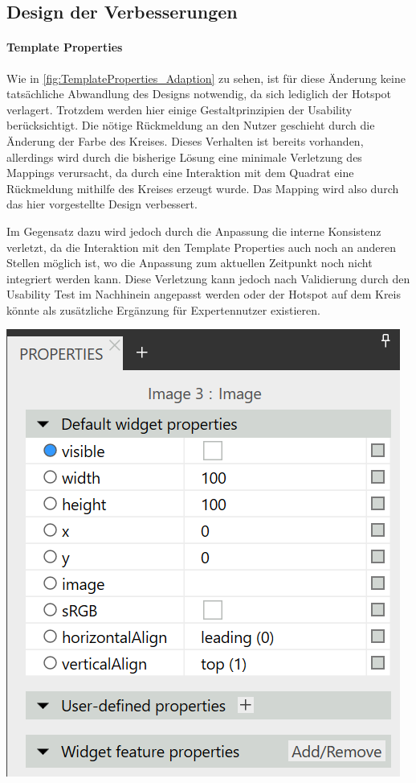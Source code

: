 \subsection{Design der Verbesserungen}

\paragraph{Template Properties}

Wie in \cref{fig:TemplateProperties_Adaption} zu sehen, ist für diese Änderung keine tatsächliche Abwandlung des Designs notwendig, da sich lediglich der Hotspot verlagert.
Trotzdem werden hier einige Gestaltprinzipien der Usability berücksichtigt.
Die nötige Rückmeldung an den Nutzer geschieht durch die Änderung der Farbe des Kreises.
Dieses Verhalten ist bereits vorhanden, allerdings wird durch die bisherige Lösung eine minimale Verletzung des Mappings verursacht, da durch eine Interaktion mit dem Quadrat eine Rückmeldung mithilfe des Kreises erzeugt wurde. 
Das Mapping wird also durch das hier vorgestellte Design verbessert.

Im Gegensatz dazu wird jedoch durch die Anpassung die interne Konsistenz verletzt, da die Interaktion mit den Template Properties auch noch an anderen Stellen möglich ist, wo die Anpassung zum aktuellen Zeitpunkt noch nicht integriert werden kann.
Diese Verletzung kann jedoch nach Validierung durch den Usability Test im Nachhinein angepasst werden oder der Hotspot auf dem Kreis könnte als zusätzliche Ergänzung für Expertennutzer existieren.

\begin{center}
  \includegraphics[scale=0.8]{figures/TemplateProperties_Adaption.png}
  \label{fig:TemplateProperties_Adaption}
\end{center}

